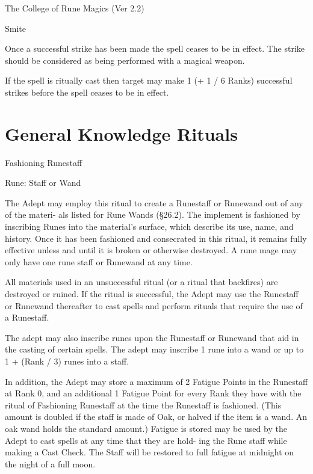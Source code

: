 \begin{Chapter}{The College of Rune Magics (Ver 2.2)}
\begin{spell}[G-7]{Smite}
\begin{effects}
Once a successful strike has been made the spell ceases to be in
effect. The strike should be considered as being performed with a
magical weapon.

If the spell is ritually cast then target may make 1 (+ 1 / 6 Ranks)
successful strikes before the spell ceases to be in effect.
\end{effects}
\end{spell}

\section{General Knowledge Rituals}

\begin{ritual}[Q-1]{Fashioning Runestaff }

Rune: Staff or Wand 
\begin{effects}
The Adept may employ this ritual to create 
a Runestaff or Runewand out of any of the materi-
als listed for Rune Wands  (§26.2). The implement 
is fashioned by inscribing Runes into the material’s 
surface, which describe its use, name, and history. 
Once it has been fashioned and consecrated in this 
ritual,  it  remains  fully  effective  unless  and  until  it 
is  broken  or  otherwise  destroyed.  A  rune  mage 
may only have one rune staff or Runewand at  any 
time. 

All  materials  used  in  an  unsuccessful  ritual  (or  a 
ritual that backfires) are destroyed or ruined. If the 
ritual  is  successful,  the  Adept  may  use  the 
Runestaff or Runewand thereafter to cast spells and 
perform rituals that require the use of a Runestaff. 

The  adept  may  also  inscribe  runes  upon  the 
Runestaff  or  Runewand  that  aid  in  the  casting  of 
certain spells. The adept may inscribe 1 rune into a 
wand or up to 1 + (Rank / 3) runes into a staff. 

In  addition,  the  Adept  may  store  a  maximum of  2 
Fatigue  Points  in  the  Runestaff  at  Rank  0,  and  an 
additional  1  Fatigue  Point  for  every  Rank  they 
have with the ritual of Fashioning Runestaff at the 
time  the  Runestaff  is  fashioned.  (This  amount  is 
doubled if the staff is made of Oak, or halved if the 
item  is  a  wand.  An  oak  wand  holds  the  standard 
amount.)  Fatigue  is  stored  may  be  used  by  the 
Adept to cast spells at any time that they are hold-
ing the Rune staff while making a Cast Check. The 
Staff will be restored to full fatigue at midnight on 
the night of a full moon. 


\end{effects}
\end{ritual}
\end{Chapter}
